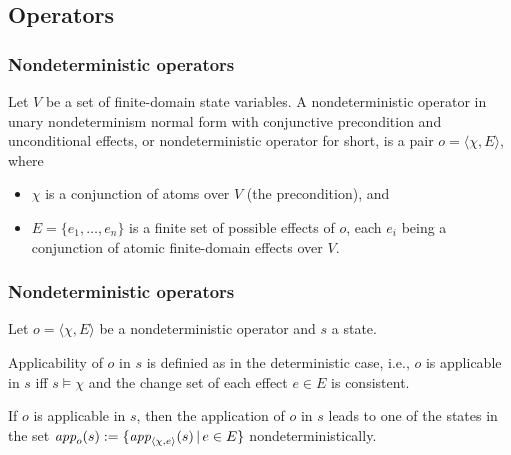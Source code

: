 \documentclass{gkibeamer}
\begin{document}
\subsection{Operators}

\begin{frame}
  \frametitle{Nondeterministic operators}
  \begin{definition}
    Let $V$ be a set of finite-domain state variables.  A
    nondeterministic operator in unary nondeterminism normal
    form with conjunctive precondition and unconditional effects, or
    \alert{nondeterministic operator} for short, is a pair $o = \langle
    \chi, E \rangle$, where
    \begin{itemize}
    \item $\chi$ is a conjunction of atoms over $V$ (the
      \alert{precondition}), and
    \item $E = \{ e_1, \dots, e_n \}$ is a finite set of possible
      \alert{effects} of $o$, each $e_i$ being a conjunction of atomic
      finite-domain effects over $V$.
    \end{itemize}
  \end{definition}
\end{frame}

\begin{frame}
  \frametitle{Nondeterministic operators}
  \begin{definition}
    Let $o = \langle \chi, E \rangle$ be a nondeterministic operator
    and $s$ a state.

    \medskip

    Applicability of $o$ in $s$ is definied as in the deterministic
    case, i.e., $o$ is \alert{applicable} in $s$ iff $s \models \chi$
    and the change set of each effect $e \in E$ is consistent.

    \medskip

    If $o$ is applicable in $s$, then the \alert{application} of $o$
    in $s$ leads to one of the states in the set $\textit{app}_{o}(s) := \{
    \textit{app}_{\langle \chi, e \rangle}(s) \,|\, e \in E \}$
    nondeterministically.
  \end{definition}
\end{frame}
\end{document}
